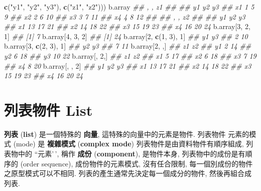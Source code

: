 \documentclass[
]{book}
\newenvironment{Shaded}{\begin{snugshade}}{\end{snugshade}}
\newcommand{\CommentTok}[1]{\textcolor[rgb]{0.56,0.35,0.01}{\textit{#1}}}
\newcommand{\DecValTok}[1]{\textcolor[rgb]{0.00,0.00,0.81}{#1}}
\newcommand{\KeywordTok}[1]{\textcolor[rgb]{0.13,0.29,0.53}{\textbf{#1}}}
\newcommand{\NormalTok}[1]{#1}
\newcommand{\StringTok}[1]{\textcolor[rgb]{0.31,0.60,0.02}{#1}}
\begin{document}
\begin{Shaded}
\begin{Highlighting}[]
                                 \KeywordTok{c}\NormalTok{(}\StringTok{"y1"}\NormalTok{, }\StringTok{"y2"}\NormalTok{, }\StringTok{"y3"}\NormalTok{),}
                                 \KeywordTok{c}\NormalTok{(}\StringTok{"z1"}\NormalTok{, }\StringTok{"z2"}\NormalTok{)))}
\NormalTok{b.array}
\CommentTok{\#\# , , z1}
\CommentTok{\#\# }
\CommentTok{\#\#    y1 y2 y3}
\CommentTok{\#\# x1  1  5  9}
\CommentTok{\#\# x2  2  6 10}
\CommentTok{\#\# x3  3  7 11}
\CommentTok{\#\# x4  4  8 12}
\CommentTok{\#\# }
\CommentTok{\#\# , , z2}
\CommentTok{\#\# }
\CommentTok{\#\#    y1 y2 y3}
\CommentTok{\#\# x1 13 17 21}
\CommentTok{\#\# x2 14 18 22}
\CommentTok{\#\# x3 15 19 23}
\CommentTok{\#\# x4 16 20 24}
\NormalTok{b.array[}\DecValTok{3}\NormalTok{, }\DecValTok{2}\NormalTok{, }\DecValTok{1}\NormalTok{]}
\CommentTok{\#\# [1] 7}
\NormalTok{b.array[}\DecValTok{4}\NormalTok{, }\DecValTok{3}\NormalTok{, }\DecValTok{2}\NormalTok{]}
\CommentTok{\#\# [1] 24}
\NormalTok{b.array[}\DecValTok{2}\NormalTok{, }\KeywordTok{c}\NormalTok{(}\DecValTok{1}\NormalTok{, }\DecValTok{3}\NormalTok{), }\DecValTok{1}\NormalTok{]}
\CommentTok{\#\# y1 y3 }
\CommentTok{\#\#  2 10}
\NormalTok{b.array[}\DecValTok{3}\NormalTok{, }\KeywordTok{c}\NormalTok{(}\DecValTok{2}\NormalTok{, }\DecValTok{3}\NormalTok{), }\DecValTok{1}\NormalTok{]}
\CommentTok{\#\# y2 y3 }
\CommentTok{\#\#  7 11}
\NormalTok{b.array[}\DecValTok{2}\NormalTok{, ,]}
\CommentTok{\#\#    z1 z2}
\CommentTok{\#\# y1  2 14}
\CommentTok{\#\# y2  6 18}
\CommentTok{\#\# y3 10 22}
\NormalTok{b.array[, }\DecValTok{2}\NormalTok{,]}
\CommentTok{\#\#    z1 z2}
\CommentTok{\#\# x1  5 17}
\CommentTok{\#\# x2  6 18}
\CommentTok{\#\# x3  7 19}
\CommentTok{\#\# x4  8 20}
\NormalTok{b.array[, , }\DecValTok{2}\NormalTok{]}
\CommentTok{\#\#    y1 y2 y3}
\CommentTok{\#\# x1 13 17 21}
\CommentTok{\#\# x2 14 18 22}
\CommentTok{\#\# x3 15 19 23}
\CommentTok{\#\# x4 16 20 24}
\end{Highlighting}
\end{Shaded}

\hypertarget{ux5217ux8868ux7269ux4ef6-list}{%
\section{列表物件 List}\label{ux5217ux8868ux7269ux4ef6-list}}

\textbf{列表}
(\textbf{list})
是一個特殊的 \textbf{向量},
這特殊的向量中的元素是物件.
列表物件 元素的模式 (mode) 是
\textbf{複雜模式}
(\textbf{complex mode})
列表物件是由資料物件有順序組成,
列表物中的 ``元素'\,',
稱作
\textbf{成份}
(\textbf{component}),
是物件本身,
列表物中的成份是有順序的
(order sequence),
成份物件的元素模式,
沒有任合限制,
每一個別成份的物件之原型模式可以不相同.
列表的產生通常先決定每一個成分的物件,
然後再組合成列表.
\end{document}
